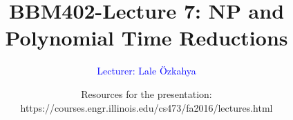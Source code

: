 \documentclass[xcolor=dvipsnames,smaller]{beamer}
\title[BBM402-Lecture 7: NP and Polynomial Time Reductions]
{BBM402-Lecture 7: NP and Polynomial Time Reductions}
\author{
\vspace{2cm}
\textcolor{Blue}{\large{Lecturer: Lale \"Ozkahya}}}
\date{
\footnotesize{
Resources for the presentation:\\
https://courses.engr.illinois.edu/cs473/fa2016/lectures.html}}
\begin{document}
\newtheorem{thm}[theorem] {Theorem}
\newtheorem{lem}[theorem]{Lemma}
\newtheorem{cor}[theorem]{Corollary}
\newtheorem{prp}[theorem]{Proposition}
\newtheorem{clm}[theorem]{Claim}
\newtheorem{conj}[theorem]{Conjecture}
\newtheorem{remark}[theorem]{Remark}
\newtheorem{construction}[theorem]{Construction}

\def\EE{\mathcal{E}}


\def\tr{\textcolor{Red}}
\def\tb{\textcolor{Blue}}
\def\vs{\vspace{0.5cm}}

\begin{frame}
\titlepage
\end{frame}

\normalsize{





}
\end{document}
